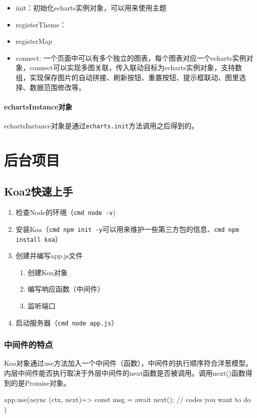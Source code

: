\begin{itemize}
    \item init：初始化echarts实例对象，可以用来使用主题
    \item registerTheme：
    \item registerMap
    \item connect: 一个页面中可以有多个独立的图表，每个图表对应一个echarts实例对象，connect可以实现多图关联，传入联动目标为echarts实例对象，支持数组，实现保存图片的自动拼接、刷新按钮、重置按钮、提示框联动、图里选择、数据范围修改等。
\end{itemize}
\subsubsection{echartsInstance对象}
echartsInstance对象是通过\verb|echarts.init|方法调用之后得到的。

\chapter{后台项目}
\section{Koa2快速上手}
\begin{enumerate}
    \item 检查Node的环境（\verb|cmd node -v|)
    \item 安装Koa（\verb|cmd npm init -y|可以用来维护一些第三方包的信息、\verb|cmd npm install koa|）
    \item 创建并编写app.js文件
    \begin{enumerate}
        \item 创建Koa对象
        \item 编写响应函数（中间件）
        \item 监听端口
    \end{enumerate}
    \item 启动服务器（\verb|cmd node app.js|）
\end{enumerate}

\subsection{中间件的特点}
Koa对象通过use方法加入一个中间件（函数），中间件的执行顺序符合洋葱模型。内层中间件能否执行取决于外层中间件的next函数是否被调用。调用next()函数得到的是Promise对象。

\begin{js}
app.use(async (ctx, next)=>{
    const msg = await next();
    // codes you want to do
})
\end{js}

